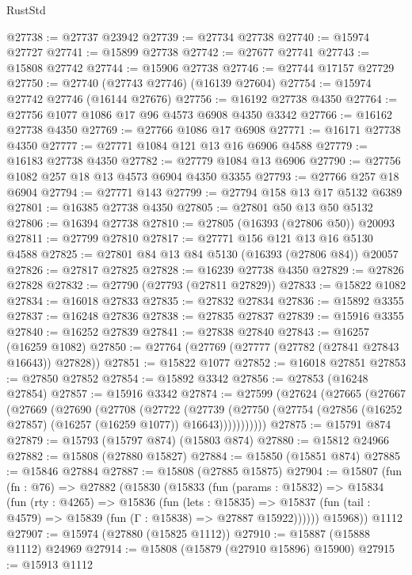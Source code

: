 \begin{lexlean}{RustStd}
\begin{coremodule}
@27738 := @27737 @23942
@27739 := @27734 @27738
@27740 := @15974 @27727
@27741 := @15899 @27738
@27742 := @27677 @27741
@27743 := @15808 @27742
@27744 := @15906 @27738
@27746 := @27744 @17157 @27729
@27750 := @27740 (@27743 @27746) (@16139 @27604)
@27754 := @15974 @27742 @27746 (@16144 @27676)
@27756 := @16192 @27738 @4350
@27764 := @27756 @1077 @1086 @17 @96 @4573 @6908 @4350 @3342
@27766 := @16162 @27738 @4350
@27769 := @27766 @1086 @17 @6908
@27771 := @16171 @27738 @4350
@27777 := @27771 @1084 @121 @13 @16 @6906 @4588
@27779 := @16183 @27738 @4350
@27782 := @27779 @1084 @13 @6906
@27790 := @27756 @1082 @257 @18 @13 @4573 @6904 @4350 @3355
@27793 := @27766 @257 @18 @6904
@27794 := @27771 @143
@27799 := @27794 @158 @13 @17 @5132 @6389
@27801 := @16385 @27738 @4350
@27805 := @27801 @50 @13 @50 @5132
@27806 := @16394 @27738
@27810 := @27805 (@16393 (@27806 @50)) @20093
@27811 := @27799 @27810
@27817 := @27771 @156 @121 @13 @16 @5130 @4588
@27825 := @27801 @84 @13 @84 @5130 (@16393 (@27806 @84)) @20057
@27826 := @27817 @27825
@27828 := @16239 @27738 @4350
@27829 := @27826 @27828
@27832 := @27790 (@27793 (@27811 @27829))
@27833 := @15822 @1082
@27834 := @16018 @27833
@27835 := @27832 @27834
@27836 := @15892 @3355
@27837 := @16248 @27836
@27838 := @27835 @27837
@27839 := @15916 @3355
@27840 := @16252 @27839
@27841 := @27838 @27840
@27843 := @16257 (@16259 @1082)
@27850 := @27764 (@27769 (@27777 (@27782 (@27841 @27843 @16643)) @27828))
@27851 := @15822 @1077
@27852 := @16018 @27851
@27853 := @27850 @27852
@27854 := @15892 @3342
@27856 := @27853 (@16248 @27854)
@27857 := @15916 @3342
@27874 := @27599
    (@27624
      (@27665
        (@27667
          (@27669
            (@27690
              (@27708
                (@27722
                  (@27739
                    (@27750
                      (@27754 (@27856 (@16252 @27857) (@16257 (@16259 @1077)) @16643)))))))))))
@27875 := @15791 @874
@27879 := @15793 (@15797 @874) (@15803 @874)
@27880 := @15812 @24966
@27882 := @15808 (@27880 @15827)
@27884 := @15850 (@15851 @874)
@27885 := @15846 @27884
@27887 := @15808 (@27885 @15875)
@27904 := @15807
    (fun (fn : @76) =>
    @27882
      (@15830
        (@15833
          (fun (params : @15832) =>
          @15834
            (fun (rty : @4265) =>
            @15836
              (fun (lets : @15835) =>
              @15837 (fun (tail : @4579) => @15839 (fun (Γ : @15838) => @27887 @15922))))))
        @15968))
    @1112
@27907 := @15974 (@27880 (@15825 @1112))
@27910 := @15887 (@15888 @1112) @24969
@27914 := @15808 (@15879 (@27910 @15896) @15900)
@27915 := @15913 @1112

\end{coremodule}
\end{lexlean}
